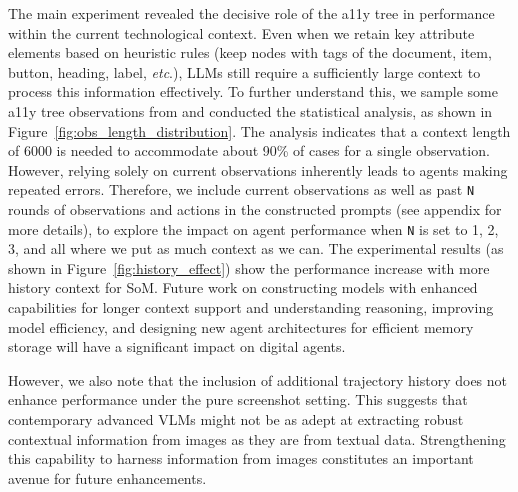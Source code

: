 The main experiment revealed the decisive role of the a11y tree in performance within the current technological context. 
Even when we retain key attribute elements based on heuristic rules (keep nodes with tags of the document, item, button, heading, label, \textit{etc}.), LLMs still require a sufficiently large context to process this information effectively. 
To further understand this, we sample some a11y tree observations from \ours and conducted the statistical analysis, as shown in Figure~\ref{fig:obs_length_distribution}. 
The analysis indicates that a context length of 6000 is needed to accommodate about 90\% of cases for a single observation.
However, relying solely on current observations inherently leads to agents making repeated errors.
Therefore, we include current observations as well as past \texttt{N} rounds of observations and actions in the constructed prompts (see appendix for more details), to explore the impact on agent performance when \texttt{N} is set to 1, 2, 3, and all where we put as much context as we can.
The experimental results (as shown in Figure~\ref{fig:history_effect}) show the performance increase with more history context for SoM.
Future work on constructing models with enhanced capabilities for longer context support and understanding reasoning, improving model efficiency, and designing new agent architectures for efficient memory storage will have a significant impact on digital agents.

However, we also note that the inclusion of additional trajectory history does not enhance performance under the pure screenshot setting.
This suggests that contemporary advanced VLMs might not be as adept at extracting robust contextual information from images as they are from textual data. 
Strengthening this capability to harness information from images constitutes an important avenue for future enhancements.



